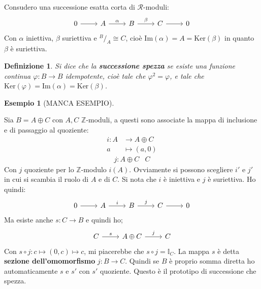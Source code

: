 \documentclass[10pt, twoside=false, x11names]{scrbook}
\newtheorem{definition}[theorem]{Definizione}
\newtheorem{example}[theorem]{Esempio}
\newcommand{\R}{\mathcal{R}}
\newcommand{\Z}{\mathbb{Z}}
\newcommand{\im}[1]{\mathrm{Im}( #1 )}
\renewcommand{\ker}[1]{\mathrm{Ker}( #1)}
\renewcommand{\phi}{\varphi}
\newcommand{\Id}[1][]{\mathbb{I}_#1}
\newcommand*\quot[2]{{^{\textstyle #1}\big/_{\textstyle #2}}}
\begin{document}
Consudero una successione esatta corta di $ \R $-moduli:
\[
  \begin{tikzcd}
    0 \arrow{r}{} & A \arrow{r}{\alpha} & B \arrow{r}{\beta} & C \arrow{r}{} & 0
  \end{tikzcd}
\]
Con $ \alpha $ iniettiva, $ \beta $ suriettiva e $ \quot{B}{A} \cong C $, cioè
$ \im{\alpha} = A = \ker{\beta} $ in quanto $ \beta $ è suriettiva.
\begin{definition}
  Si dice che la \textbf{successione spezza} se esiste una
  funzione continua $ \phi \colon B \to B $ idempotente, cioè tale che $ \phi^2 = \phi $, e tale che
  $ \ker{\phi} = \im{\alpha} = \ker{\beta} $.
\end{definition}

\begin{example}
  [MANCA ESEMPIO]
\end{example}



Sia $ B = A \oplus C $ con $ A, C $ $ \Z $-moduli, a questi sono associate la mappa
di inclusione e di passaggio al quoziente:
\begin{align*}
  i \colon A & \to A \oplus C \\
  a & \mapsto (a, 0)
\end{align*}
\begin{align*}
  j \colon A \oplus C & C
\end{align*}
Con $ j $ quoziente per lo $ \Z $-modulo $ i(A) $. Ovviamente si possono
scegliere $ i' $ e $ j' $ in cui si scambia il ruolo di $ A $ e di $ C $.
Si nota che $ i $ è iniettiva e $ j $ è suriettiva.
Ho quindi:
\[
  \begin{tikzcd}
    0 \arrow{r}{} & A \arrow{r}{i} & B \arrow{r}{j} & C \arrow{r}{} & 0
  \end{tikzcd}
\]
Ma esiste anche $ s \colon C \to B $ e quindi ho;
\[
  \begin{tikzcd}
    C \arrow{r}{s} & A \oplus C \arrow{r}{j} & C
  \end{tikzcd}
\]
Con $ s \circ j \colon c \mapsto (0,c) \mapsto c $, mi piacerebbe che $ s \circ j = \Id{C} $.
La mappa $ s $ è detta \textbf{sezione dell'omomorfismo}
$ j \colon B \to C $.
Quindi se $ B $ è proprio somma diretta ho automaticamente $ s $ e $ s' $ con $ s' $
quoziente. Questo è il prototipo di successione che spezza.
\end{document}
